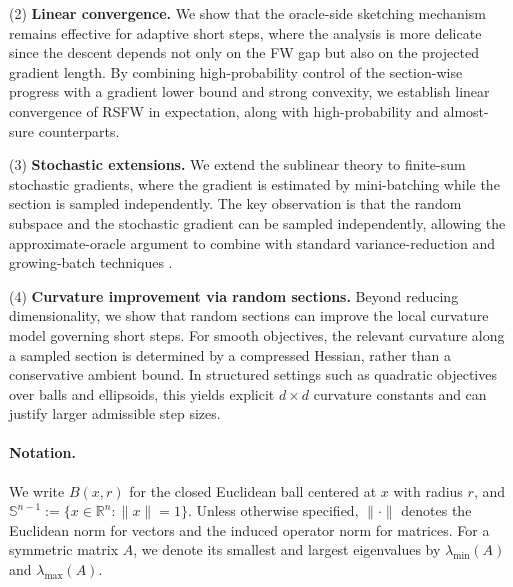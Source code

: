 \documentclass{article}
\begin{document}
(2) \textbf{Linear convergence.}
We show that the oracle-side sketching mechanism remains effective for adaptive
short steps, where the analysis is more delicate since the descent depends not
only on the FW gap but also on the projected gradient length. By combining
high-probability control of the section-wise progress with a gradient lower
bound and strong convexity, we establish linear convergence of RSFW in
expectation, along with high-probability and almost-sure counterparts.

(3) \textbf{Stochastic extensions.}
We extend the sublinear theory to finite-sum stochastic gradients, where the
gradient is estimated by mini-batching while the section is sampled
independently. The key observation is
that the random subspace and the stochastic gradient can be sampled
independently, allowing the approximate-oracle argument to combine with
standard variance-reduction and growing-batch techniques
\cite{HazanKale2012ProjectionFreeOnline,HazanLuo2016VRPF,
LocatelloYurtseverFercoqCevher2019SFW,
NegiarDresdnerTsaiElGhaouiLocatelloFreundPedregosa2020SFW,
DresdnerVladareanRatschLocatelloCevherYurtsever2022OneSample}.

(4) \textbf{Curvature improvement via random sections.}
Beyond reducing dimensionality, we show that random sections can improve the
local curvature model governing short steps. For smooth objectives, the
relevant curvature along a sampled section is determined by a compressed
Hessian, rather than a conservative ambient bound. In structured settings such
as quadratic objectives over balls and ellipsoids, this yields explicit
\(d \times d\) curvature constants and can justify larger admissible step
sizes.

\paragraph{Notation.}
We write \(B(x,r)\) for the closed Euclidean ball centered at \(x\) with radius
\(r\), and \(\mathbb S^{n-1}:=\{x\in\mathbb R^n:\|x\|=1\}\). Unless otherwise
specified, \(\|\cdot\|\) denotes the Euclidean norm for vectors and the induced
operator norm for matrices. For a symmetric matrix \(A\), we denote its smallest
and largest eigenvalues by \(\lambda_{\min}(A)\) and \(\lambda_{\max}(A)\).
\end{document}

